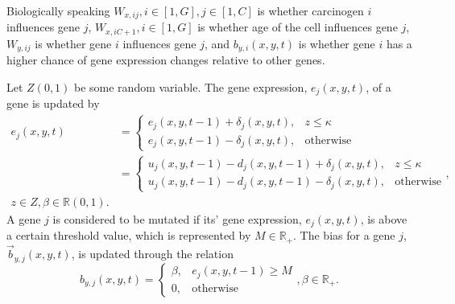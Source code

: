 \documentclass[\main/thesis.tex]{subfiles}
\begin{document}
Biologically speaking $W_{x,ij}, i {\in} [1, G], j {\in} [1, C]$ is whether 
carcinogen $i$ influences gene $j$, $W_{x,iC {+} 1}, i {\in} [1, G]$ is whether 
age of the cell influences gene $j$, $W_{y,ij}$ is whether gene $i$ influences 
gene $j$, and $b_{y,i}(x, y, t)$ is whether gene $i$ has a higher chance of gene 
expression changes relative to other genes.

Let $Z(0, 1)$ be some random variable. The gene expression, $e_j(x, y, t)$, of a 
gene is updated by
\begin{align*}
e_j(x, y, t) &{=} \begin{cases}
                   e_j(x, y, t {-} 1) + \delta_j(x, y, t), &z {\le} \kappa \\
                   e_j(x, y, t {-} 1) - \delta_j(x, y, t), &\text{otherwise}
                 \end{cases} \\
             &{=} \begin{cases}
                   u_j(x, y, t {-} 1) - d_j(x, y, t {-} 1) + \delta_j(x, y, t), &z {\le} \kappa \\
                   u_j(x, y, t {-} 1) - d_j(x, y, t {-} 1) - \delta_j(x, y, t), &\text{otherwise}
                 \end{cases},\\
z {\in} Z, \beta {\in} \mathbb{R}(0, 1).
\end{align*}
A gene $j$ is considered to be mutated if its' gene expression, $e_j(x, y, t)$, 
is above a certain threshold value, which is represented by $M {\in} 
\mathbb{R}_+$. The bias for a gene $j$, $\vec{b}_{y, j}(x, y, t)$, is updated 
through the relation
$$
b_{y, j}(x, y, t) {=} \begin{cases}
                        \beta, &e_j(x, y, t {-} 1) {\ge} M \\
                        0, &\text{otherwise}
                      \end{cases},
\beta {\in} \mathbb{R}_+.
$$
\end{document}
